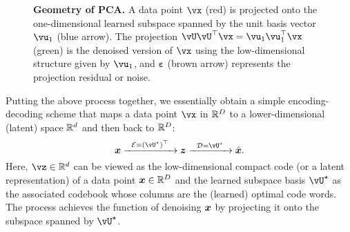 \documentclass[../../book-main.tex]{subfiles}
\begin{document}
\begin{figure}
    \centering
    \caption{\small \textbf{Geometry of PCA.} A data point $\vx$ (red) is projected onto the one-dimensional learned subspace spanned by the unit basis vector $\vu_1$ (blue arrow). The projection $\vU\vU^\top\vx = \vu_{1}\vu_{1}^{\top}\vx$ (green) is the denoised version of $\vx$ using the low-dimensional structure given by $\vu_{1}$, and $\boldsymbol{\varepsilon}$ (brown arrow) represents the projection residual or noise.}
    \label{fig:pca-geometry}
\end{figure}

Putting the above process together, we essentially obtain a simple encoding-decoding scheme that maps a data point $\vx$ in $\mathbb{R}^D$ to a lower-dimensional (latent) space $\mathbb{R}^d$ and then back to $\mathbb{R}^D$:
\begin{equation}
\x \xrightarrow{\hspace{2mm} \mathcal{E} = (\vU^\star)^\top \hspace{2mm}}  \z
    \xrightarrow{\hspace{2mm} \mathcal{D} = \vU^\star \hspace{2mm}}   \hat{\x}.  
\label{eqn:autoencoding-PCA}
\end{equation}
Here, $\vz \in \R^d$ can be viewed as the low-dimensional compact code (or
a latent representation) of a data point  $\bm{x} \in \mathbb{R}^D$ and the learned subspace
basis $\vU^\star$ as the associated codebook whose columns are the (learned)
optimal code words. The process achieves the function of denoising $\bm{x}$ by
projecting it onto the subspace spanned by $\vU^\star$.
\end{document}

